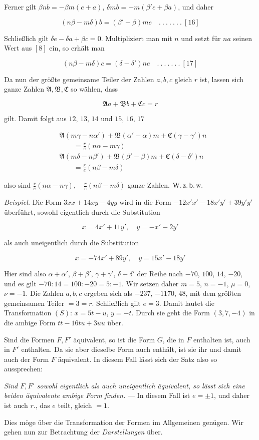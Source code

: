 Ferner gilt $\beta nb=-\beta m(e+a)$, $\delta mb=-m(\beta'e+\beta a)$, und daher

\[
(n\beta-m\delta)b=(\beta'-\beta)me\quad .\ .\ .\ .\ .\ .\ .\ [16]
\]

Schließlich gilt $\delta e-\delta a+\beta c=0$. Multipliziert man mit $n$ und setzt für $na$ seinen Wert aus $[8]$ ein, so erhält man

\[
(n\beta-m\delta)c=(\delta-\delta')ne\quad .\ .\ .\ .\ .\ .\ .\ [17]
\]

Da nun der größte gemeinsame Teiler der Zahlen $a,b,c$ gleich $r$ ist, lassen sich ganze Zahlen $\mathfrak{A},\mathfrak{B},\mathfrak{C}$ so wählen, dass

\[
\mathfrak{A}a+\mathfrak{B}b+\mathfrak{C}c=r
\]

gilt. Damit folgt aus $12$, $13$, $14$ und $15$, $16$, $17$

\[
\begin{aligned}&\mathfrak A(m\gamma-n\alpha')+\mathfrak B(\alpha'-\alpha)m+\mathfrak C(\gamma-\gamma')n\\&\qquad=\frac re(n\alpha-m\gamma)\\&\mathfrak A(m\delta-n\beta')+\mathfrak B(\beta'-\beta)m+\mathfrak C(\delta-\delta')n\\&\qquad=\frac re(n\beta-m\delta)\end{aligned}
\]

also sind $\frac{r}{e}(n\alpha-n\gamma),\quad\frac{r}{e}(n\beta-m\delta)$ ganze Zahlen. $\text{W.\,z.\,b.\,w.}$



\emph{Beispiel.} Die Form $3xx+14xy-4yy$ wird in die Form $-12x'x'-18x'y'+39y'y'$ überführt, sowohl eigentlich durch die Substitution

\[
x=4x'+11y',\quad y=-x'-2y'
\]

als auch uneigentlich durch die Substitution

\[
x=-74x'+89y',\quad y=15x'-18y'
\]

Hier sind also $\alpha+\alpha'$, $\beta+\beta'$, $\gamma+\gamma'$, $\delta+\delta'$ der Reihe nach $-70$, $100$, $14$, $-20$, und es gilt $-70:14=100:-20=5:-1$. Wir setzen daher $m=5$, $n=-1$, $\mu=0$, $\nu=-1$. Die Zahlen $a,b,c$ ergeben sich als $-237$, $-1170$, $48$, mit dem größten gemeinsamen Teiler $=3=r$. Schließlich gilt $e=3$. Damit lautet die Transformation $(S)$: $x=5t-u$, $y=-t$. Durch sie geht die Form $(3,7,-4)$ in die ambige Form $tt-16tu+3uu$ über.

Sind die Formen $F,F'$ äquivalent, so ist die Form $G$, die in $F$ enthalten ist, auch in $F'$ enthalten. Da sie aber dieselbe Form auch enthält, ist sie ihr und damit auch der Form $F$ äquivalent. In diesem Fall lässt sich der Satz also so aussprechen:

\emph{Sind $F,F'$ sowohl eigentlich als auch uneigentlich äquivalent, so lässt sich eine beiden äquivalente ambige Form finden.} --- In diesem Fall ist $e=\pm1$, und daher ist auch $r.$, das $e$ teilt, gleich $=1$.

Dies möge über die Transformation der Formen im Allgemeinen genügen. Wir gehen nun zur Betrachtung der \emph{Darstellungen} über.

